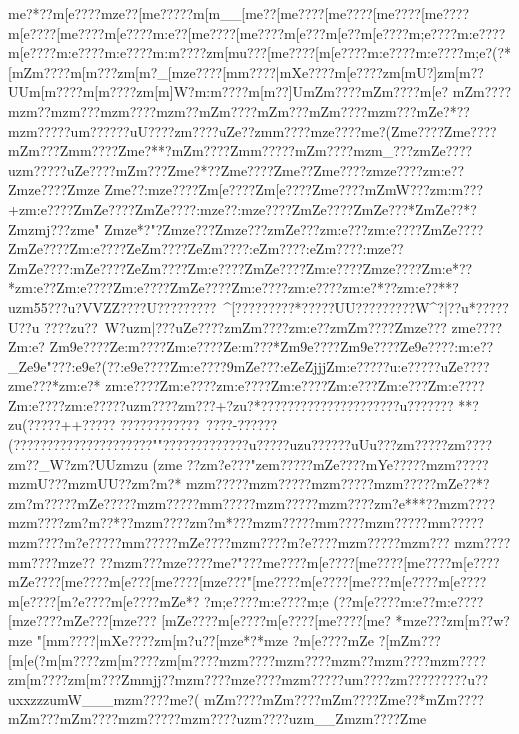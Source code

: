 {{{{{{{{{{{{{{{{{{{{{{{{{{{{{{{{{{{{{{{{{{{{{{{{{{{{{{{{{{{{{{{{{{{{{{{{{{{{{{{{{{{{{{{{{{{{{{{{{{{{{{{{{{{{{{{{{{{{{{{{{{{{{{{{{{{{{{{{{{{{{{{{{{{{{{{{{{{{{{{{{{{{{{{{{{{{{{{{{{{{{{{{{{{{m{e?*??{m[e????{mze??[m{e?????m[m__[m{e??[m{e????[m{e????[m{e????[m{e????{m[e????[m{e????{m[e????{m:e??[m{e????[m{e????{m[e???{m[e??{m[e????{m;e????{m:e????{m[e????{m:e????{m:e????{m:m????zm[mu???[m{e????[m[e????{m:e????{m:e????{m;e?(?*[mZm????{m[m???zm[m?_[mze????[m{m????|mXe????{m[e????zm[mU?]zm[m??UU{m[m????{m[m????zm[m]}W?{m:m ????m[m??]U{mZm????{mZm????{m[e?   {mZm????{mzm??{mzm???{mzm????{mzm??{mZm????{mZm???{mZm????{mzm???{mZe?*??{mzm?????u{m?????}?uU????}zm??? ?uZe??zm{m????{mze????{m{e ?(Zm{e????Zm{e????{mZm???Zm{m????Zm{e?**?{mZm????Zm{m?????mZm????{mzm_???zmZe??? ?uzm?????uZe????{mZm???Zm{e?*??Zm{e????Zm{e??Zm{e????zmze????zm:e??Zmze????Zmze 
Zm{e??:mze????Zm[e????Zm[e????Zm{e????{mZmW???zm:m???+zm:e????ZmZe????ZmZe????:mze??:mze????ZmZe????ZmZe???*ZmZe??*?Zmzmj???zm{e "
Zmze*?"?Zmze???Zmze???zmZe???zm:e???zm:e????ZmZe????ZmZe????Zm:e????ZeZm????ZeZm????:eZm????:eZm????:mze??ZmZe????:mZe????ZeZm????Zm:e????ZmZe????Zm:e????Zmze????Zm:e*??*zm:e??Zm:e????Zm:e????ZmZe????Zm:e????zm:e????zm:e?*??zm:e??**?uzm55???u?}VVZZ??}??U???}??????}~^[???}??????}*?????UU????}?????}W^?|?}?u* ?}?}???U?}?u
????}zu??~W?uzm|???uZe????zmZm????zm:e??zmZm????Zmze???
zme????Zm:e? 
Zm9e????Ze:m????Zm:e????Ze:m???*Zm9e????Zm9e????Ze9e????:m:e??_Ze9e"???:e9e?(??:e9e????Zm:e????9mZe?}??:eZeZjjjZm:e?????u:e?????uZe????zme???*zm:e?*
 zm:e????Zm:e????zm:e????Zm:e????Zm:e???Zm:e???Zm:e????Zm:e????zm:e?????uzm????}zm???+?}zu?*?}?}?????}?}?????}?}???????u?????}?}?
**?}zu (?????}++????}? ?????}???????}~????}-??????} (?????}???????}???????}??""???}????}?}????}?u?????uzu?????}?uUu???}zm?????}zm????}zm??_W?}zm?UUzmzu ( zm{e ? ?zm?e???"ze{m?????mZe????mYe?????mzm?????mzmU???mzmUU??zm?m?*  {mzm?????mzm?????mzm?????mzm?????mZe??*?zm?m?????mZe?????mzm?????m{m?????mzm?????mzm????zm?e***??mzm????mzm????zm?m??*??mzm????zm?m*???{mzm?????m{m????{mzm?????m{m?????mzm????{m?e?????m{m?????mZe????{mzm????{m?e????mzm?????mzm???
{mzm??? ?m{m????{mze?? ??mzm???mze????{m{e?"???m{e????{m[e????[m{e????[m{e????{m[e????{mZe????[m{e????{m[e???[m{e????[mze???"[m{e????{m[e????[m{e???{m[e????{m[e????{m[e????[m?e????{m[e????{mZe*?
?{m;e????{m:e????{m;e
(??{m[e????{m:e??{m:e????[mze????{mZe???[mze???
[mZe????{m[e????{m[e????[m{e????[m{e?  *{mze ???zm[m??w?{mze  "[m{m????|mXe????zm[m?u??[mze *?*{mze ?  {m[e????{mZe 
 ?[mZm???[m[e(? {m[m????zm[m????zm[m????{mzm????{mzm????{mzm??{mzm????{mzm????zm[m????zm[m???Zm{mjj??{mzm????{mze????{mzm?????u{m????}zm?????}?}???u?}?uxxzzzu{mW___{mzm????{m{e?(
{mZm????{mZm????{mZm????Zm{e??*{mZm????{mZm???{mZm????{mzm?????mzm????{uzm????uzm__Zmzm????Zm{e
}}}}}}}}}}}}}}}}}}}}}}}}}}}}}}}}}}}}}}}}}}}}}}}}}}}}}}}}}}}}}}}}}}}}}}}}}}}}}}}}}}}}}}}}}}}}}}}}}}}}}}}}}}}}}}}}}}}}}}}}}}}}}}}}}}}}}}}}}}}}}}}}}}}}}}}}}}}}}}}}}}}}}}}}}}}}}}}}}}}}}}}}}}}}}}}}}}}}}}}}}}}}}}}}}}}}}}}}}}}}}}}}}}}}}}}}}}}}}}}}}}}}}}}}}}}}}}}}}}}}}}}}}}}}}}}}}}}}}}}}}}}}
